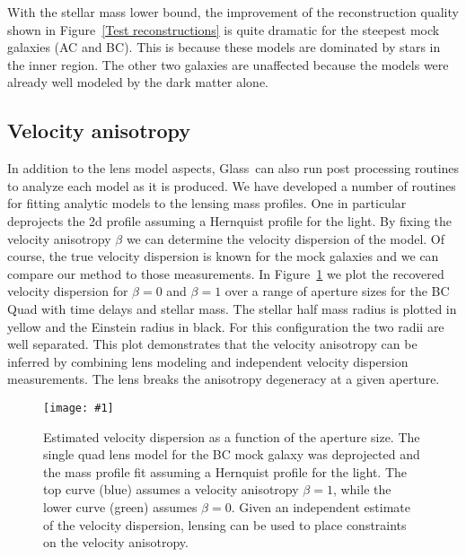 \documentclass[onecolumn,galley]{mn2e}
\newcommand{\Glass}{{\sc Glass}}
\newcommand{\figref}[1] {Figure~\ref{#1}}
\newcommand\plotone[1]{%
 \centering
 \leavevmode
 \texttt{[image: \#1]}%
}%
\begin{document}
With the stellar mass lower bound, the improvement of the reconstruction
quality shown in \figref{Test reconstructions} is quite dramatic for the
steepest mock galaxies (AC and BC). This is because these models are dominated
by stars in the inner region. The other two galaxies are unaffected because the
models were already well modeled by the dark matter alone.

\subsection{Velocity anisotropy}

In addition to the lens model aspects, \Glass\ can also run post processing
routines to analyze each model as it is produced. We have developed a number of
routines for fitting analytic models to the lensing mass profiles. One in
particular deprojects the 2d profile assuming a Hernquist profile for the
light. By fixing the velocity anisotropy $\beta$ we can determine the velocity
dispersion of the model. Of course, the true velocity dispersion is known for
the mock galaxies and we can compare our method to those measurements.  In
\figref{sigma-beta} we plot the recovered velocity dispersion for $\beta=0$ and $\beta=1$
over a range of aperture sizes for the BC Quad with time delays and stellar
mass. The stellar half mass radius is plotted in yellow and the Einstein radius
in black. For this configuration the two radii are well separated. This plot
demonstrates that the velocity anisotropy can be inferred by combining lens
modeling and independent velocity dispersion measurements. The lens breaks
the anisotropy degeneracy at a given aperture.

\begin{figure}
\plotone{BCQuadR1a_TmS-sb.pdf}
\caption{Estimated velocity dispersion as a function of the aperture size. The
single quad lens model for the BC mock galaxy was deprojected and the mass
profile fit assuming a Hernquist profile for the light. The top curve (blue)
assumes a velocity anisotropy $\beta=1$, while the lower curve (green)
assumes $\beta=0$. Given an independent estimate of the velocity dispersion,
lensing can be used to place constraints on the velocity anisotropy.}
\label{sigma-beta}
\end{figure}

%
\end{document}
